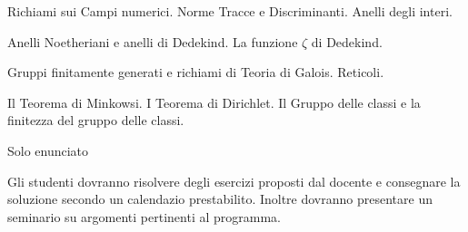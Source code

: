 
\def\abbrcorso{AL420}
\def\titolocorso{Teoria algebrica dei numeri}
\def\sottotitolo{http://www.mat.uniroma3.it/users/pappa/CORSI/AL420$_-$18$_-$19/AL420.htm}
\def\docente{Prof. Francesco Pappalardi}
\def\crediti{7}
\def\semestre{II}
\def\esoneri{0}
\def\scrittofinale{0}
\def\oralefinale{1}
\def\altreprove{1}
\Intestazione 

Richiami sui Campi numerici. Norme Tracce e Discriminanti. Anelli degli interi.

Anelli Noetheriani e anelli di Dedekind. La funzione $\zeta$ di Dedekind.

 Gruppi finitamente generati e richiami di Teoria di Galois. Reticoli.

 Il Teorema di Minkowsi. I Teorema di Dirichlet. Il Gruppo delle classi e la finitezza del gruppo delle classi.

 Solo enunciato

\testi

\bib
{} 
 
\endbib

\bib
{} 
\endbib

\bib
{}  
\endbib

\altritesti

\bib {}
 
\endbib


\bib
{}
 
\endbib

\bib
{}   
\endbib


\esami

Gli studenti dovranno risolvere degli esercizi proposti dal docente e consegnare
la soluzione secondo un calendazio prestabilito. Inoltre dovranno presentare
un seminario su argomenti pertinenti al programma.

\bye
